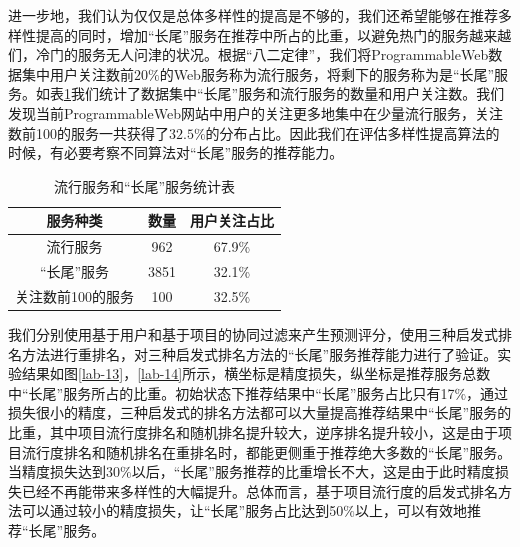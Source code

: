 \documentclass[master,winfonts]{njuthesis}
\begin{document}
进一步地，我们认为仅仅是总体多样性的提高是不够的，我们还希望能够在推荐多样性提高的同时，增加“长尾”服务在推荐中所占的比重，以避免热门的服务越来越们，冷门的服务无人问津的状况。根据“八二定律”，我们将ProgrammableWeb数据集中用户关注数前$20\%$的Web服务称为流行服务，将剩下的服务称为是“长尾”服务。如表\ref{4-1}我们统计了数据集中“长尾”服务和流行服务的数量和用户关注数。我们发现当前ProgrammableWeb网站中用户的关注更多地集中在少量流行服务，关注数前100的服务一共获得了$32.5\%$的分布占比。因此我们在评估多样性提高算法的时候，有必要考察不同算法对“长尾”服务的推荐能力。
\begin{table}[htbp]
\centering
\caption{流行服务和“长尾”服务统计表}\label{4-1}
\begin{tabular}{|c|c|c|}
\hline
服务种类       & 数量   & 用户关注占比 \\ \hline
流行服务       & 962  & 67.9\% \\ \hline
“长尾”服务     & 3851 & 32.1\% \\ \hline
关注数前100的服务 & 100  & 32.5\% \\ \hline
\end{tabular}
\end{table}

我们分别使用基于用户和基于项目的协同过滤来产生预测评分，使用三种启发式排名方法进行重排名，对三种启发式排名方法的“长尾”服务推荐能力进行了验证。实验结果如图\ref{lab-13}，\ref{lab-14}所示，横坐标是精度损失，纵坐标是推荐服务总数中“长尾”服务所占的比重。初始状态下推荐结果中“长尾”服务占比只有17$\%$，通过损失很小的精度，三种启发式的排名方法都可以大量提高推荐结果中“长尾”服务的比重，其中项目流行度排名和随机排名提升较大，逆序排名提升较小，这是由于项目流行度排名和随机排名在重排名时，都能更侧重于推荐绝大多数的“长尾”服务。当精度损失达到30$\%$以后，“长尾”服务推荐的比重增长不大，这是由于此时精度损失已经不再能带来多样性的大幅提升。总体而言，基于项目流行度的启发式排名方法可以通过较小的精度损失，让“长尾”服务占比达到50$\%$以上，可以有效地推荐“长尾”服务。
\end{document}
